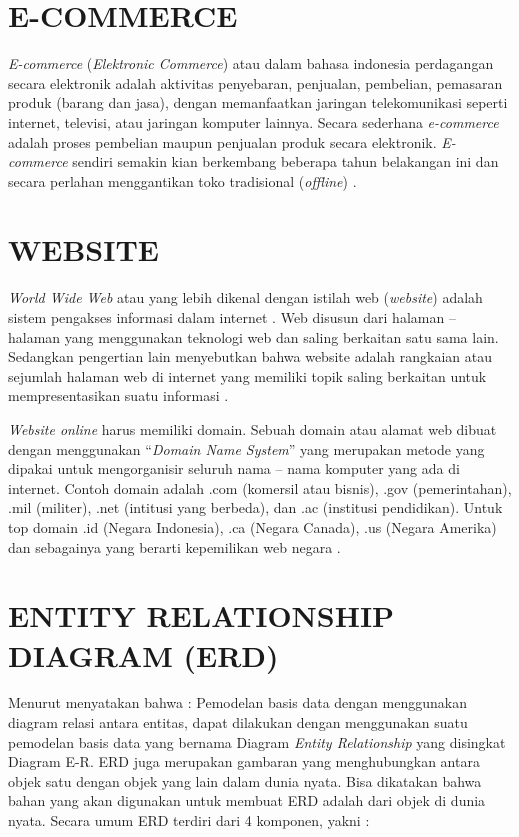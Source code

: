 \section{\uppercase{E-commerce}}
\textit{E-commerce} (\textit{Elektronic Commerce}) atau dalam bahasa indonesia perdagangan secara elektronik adalah aktivitas penyebaran, penjualan, pembelian, pemasaran produk (barang dan jasa), dengan memanfaatkan jaringan telekomunikasi seperti internet, televisi, atau jaringan komputer lainnya. Secara sederhana \textit{e-commerce} adalah proses pembelian maupun penjualan produk secara elektronik. \textit{E-commerce} sendiri semakin kian berkembang beberapa tahun belakangan ini dan secara perlahan menggantikan toko tradisional (\textit{offline}) \citep{idcloudhost2021}.

\section{\uppercase{Website}}
\textit{World Wide Web} atau yang lebih dikenal dengan istilah web (\textit{website}) adalah sistem pengakses informasi dalam internet \citep{abdul2014pengenalan}. Web disusun dari halaman – halaman yang menggunakan teknologi web dan saling berkaitan satu sama lain. Sedangkan pengertian lain menyebutkan bahwa website adalah rangkaian atau sejumlah halaman web di internet yang memiliki topik saling berkaitan untuk mempresentasikan suatu informasi \citep{ginanjar2014rahasia}.

\par \textit{Website online} harus memiliki domain. Sebuah domain atau alamat web dibuat dengan menggunakan “\textit{Domain Name System}” yang merupakan metode yang dipakai untuk mengorganisir seluruh nama – nama komputer yang ada di internet. Contoh domain adalah .com (komersil atau bisnis), .gov (pemerintahan), .mil (militer), .net (intitusi yang berbeda), dan .ac (institusi pendidikan). Untuk top domain .id (Negara Indonesia), .ca (Negara Canada), .us (Negara Amerika) dan sebagainya yang berarti kepemilikan web negara \citep{dhika2015perancangan}.

\section{\uppercase{Entity Relationship Diagram (ERD)}}
Menurut \cite{priyadi2014} menyatakan bahwa : Pemodelan basis data dengan menggunakan diagram relasi antara entitas, dapat dilakukan dengan menggunakan suatu pemodelan basis data yang bernama Diagram \textit{Entity Relationship} yang disingkat Diagram E-R. ERD juga merupakan gambaran yang menghubungkan antara objek satu dengan objek yang lain dalam dunia nyata. Bisa dikatakan bahwa bahan yang akan digunakan untuk membuat ERD adalah dari objek di dunia nyata. Secara umum ERD terdiri dari 4 komponen, yakni :

